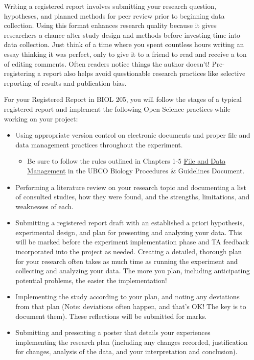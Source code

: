 \documentclass[
]{book}
\providecommand{\tightlist}{%
  \setlength{\itemsep}{0pt}\setlength{\parskip}{0pt}}
\begin{document}
Writing a registered report involves submitting your research question, hypotheses, and planned methods for peer review prior to beginning data collection. Using this format enhances research quality because it gives researchers a chance alter study design and methods before investing time into data collection. Just think of a time where you spent countless hours writing an essay thinking it was perfect, only to give it to a friend to read and receive a ton of editing comments. Often readers notice things the author doesn't! Pre-registering a report also helps avoid questionable research practices like selective reporting of results and publication bias.

For your Registered Report in BIOL 205, you will follow the stages of a typical registered report and implement the following Open Science practices while working on your project:

\begin{itemize}
\tightlist
\item
  Using appropriate version control on electronic documents and proper file and data management practices throughout the experiment.

  \begin{itemize}
  \tightlist
  \item
    Be sure to follow the rules outlined in Chapters 1-5 \href{https://ubco-biology.github.io/Procedures-and-Guidelines/file-and-data-management.html}{File and Data Management} in the UBCO Biology Procedures \& Guidelines Document.
  \end{itemize}
\item
  Performing a literature review on your research topic and documenting a list of consulted studies, how they were found, and the strengths, limitations, and weaknesses of each.
\item
  Submitting a registered report draft with an established a priori hypothesis, experimental design, and plan for presenting and analyzing your data. This will be marked before the experiment implementation phase and TA feedback incorporated into the project as needed. Creating a detailed, thorough plan for your research often takes as much time as running the experiment and collecting and analyzing your data. The more you plan, including anticipating potential problems, the easier the implementation!
\item
  Implementing the study according to your plan, and noting any deviations from that plan (Note: deviations often happen, and that's OK! The key is to document them). These reflections will be submitted for marks.
\item
  Submitting and presenting a poster that details your experiences implementing the research plan (including any changes recorded, justification for changes, analysis of the data, and your interpretation and conclusion).
\end{itemize}
\end{document}
